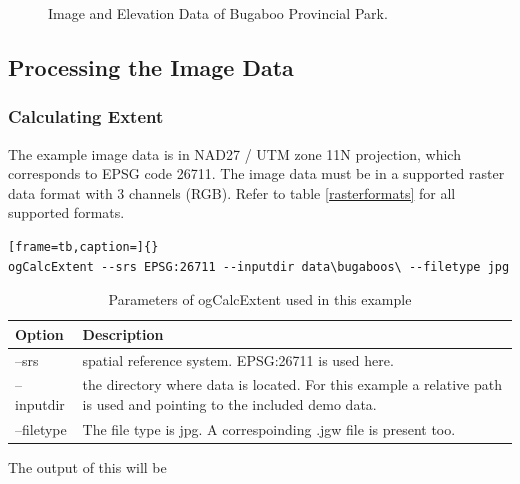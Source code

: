 \documentclass[
	12pt,
	a4paper,
	english,	
	appendixprefix,				     			        
	openany,		     	
	abstracton,		    		    
 	BCOR8mm,		    
]{scrartcl}
\newcommand{\bild}[2]{\begin{figure}[H]
      \centering
      \noindent{\texttt{[image: \#1]}}\caption{#2}
\end{figure}}
\begin{document}
\bild{images/imageElevation.png}{Image and Elevation Data of Bugaboo Provincial Park.}

\subsection{Processing the Image Data}

\subsubsection{Calculating Extent}

The example image data is in NAD27 / UTM zone 11N projection, which corresponds to EPSG code 26711. 
The image data must be in a supported raster data format with 3 channels (RGB). Refer to table \ref{rasterformats} for all supported formats.

\begin{lstlisting}[frame=tb,caption=]{} 
ogCalcExtent --srs EPSG:26711 --inputdir data\bugaboos\ --filetype jpg
\end{lstlisting}

\begin{table}[H]
\centering
\begin{tabular}{|l|p{6cm}|}
\hline
\textbf{Option}	& \textbf{Description}\\
\hline
--srs   & spatial reference system. EPSG:26711 is used here.\\
\hline
--inputdir & the directory where data is located. For this example a relative path is used and pointing to the included demo data.\\
\hline
--filetype & The file type is jpg. A correspoinding .jgw file is present too.\\
\hline
\end{tabular}
\caption{Parameters of ogCalcExtent used in this example}
\end{table}


The output of this will be 
\end{document}
